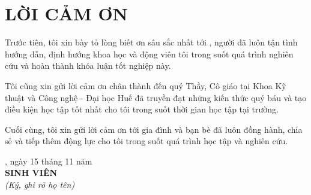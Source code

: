 \chapter*{LỜI CẢM ƠN}

Trước tiên, tôi xin bày tỏ lòng biết ơn sâu sắc nhất tới \textbf{\nguoihuongdan}, người đã luôn tận tình hướng dẫn, định hướng khoa học và động viên tôi trong suốt quá trình nghiên cứu và hoàn thành khóa luận tốt nghiệp này.

Tôi cũng xin gửi lời cảm ơn chân thành đến quý Thầy, Cô giáo tại Khoa Kỹ thuật và Công nghệ - Đại học Huế đã truyền đạt những kiến thức quý báu và tạo điều kiện học tập tốt nhất cho tôi trong suốt thời gian học tập tại trường.

Cuối cùng, tôi xin gửi lời cảm ơn tới gia đình và bạn bè đã luôn đồng hành, chia sẻ và tiếp thêm động lực cho tôi trong suốt quá trình học tập và nghiên cứu.

\vspace{1.5cm}
\begin{flushright}
\thanhpho, ngày 15 tháng 11 năm \namtotnghiep\ \\
\textbf{SINH VIÊN} \\
\textit{(Ký, ghi rõ họ tên)} \\[1.5cm]
\textbf{\sinhvien}
\end{flushright}
